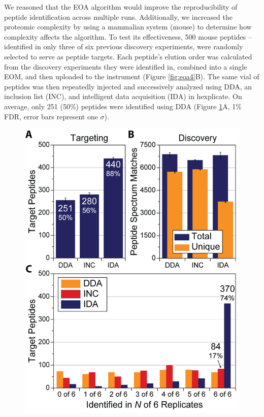 We reasoned that the EOA algorithm would improve the reproducibility of peptide identification across multiple runs. Additionally, we increased the proteomic complexity by using a mammalian system (mouse) to determine how complexity affects the algorithm. To test its effectiveness, 500 mouse peptides -- identified in only three of six previous discovery experiments, were randomly selected to serve as peptide targets. Each peptide's elution order was calculated from the discovery experiments they were identified in, combined into a single EOM, and then uploaded to the instrument (Figure \ref{fig:eoa4}B). The same vial of peptides was then repeatedly injected and successively analyzed using DDA, an inclusion list (INC), and intelligent data acquisition (IDA) in hexplicate. On average, only 251 (50\%) peptides were identified using DDA (Figure \ref{fig:eoa5}A, 1\% FDR, error bars represent one $\sigma$).
\begin{figure}[p]
	\centering
	\includegraphics[width=0.75\columnwidth]{eoa/EOA 5.png}
	\label{fig:eoa5}
\end{figure}  
